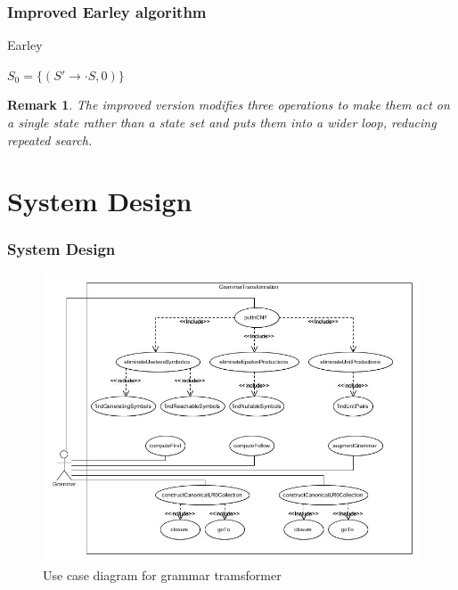\documentclass{beamer}
\newtheorem{remark}[theorem]{Remark}
\begin{document}
\begin{frame}
\frametitle{Improved Earley algorithm}
\begin{algorithm}[H]
\caption{Earley}
\label{fig: earley}

\begin{algorithmic}[1]
\ENSURE $ S_0 = \{ (S'\to\cdot S, 0) \} $

\ELSE
{}
\ENDIF
\ELSE
{}
\ENDIF
\ENDFOR
\ENDFOR
\end{algorithmic}
\end{algorithm}
\end{frame}

\begin{frame}
\begin{remark}
The improved version modifies three operations to make them act on a single state rather than a state set and puts them into a wider loop, reducing repeated search.
\end{remark}
\end{frame}

\section{System Design}
 \begin{frame}
 \frametitle{System Design}
\begin{figure}
\includegraphics[height=0.75\textheight]{GrammarTransformation.jpg}
\caption{Use case diagram for grammar tramsformer}
\label{fig: gt}
\end{figure}
 \end{frame}
 
\end{document}
